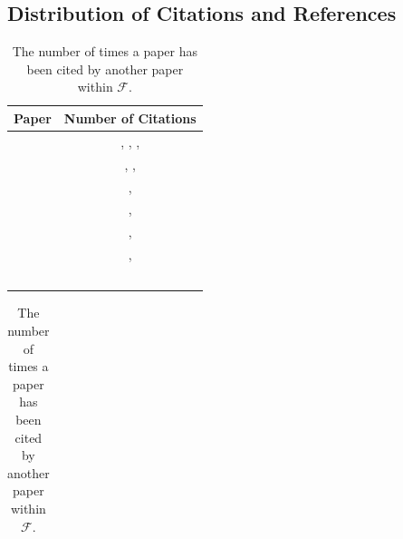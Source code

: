 \subsection{Distribution of Citations and References}

\begin{table}[t]
    \centering
    \begin{minipage}[t]{0.43\textwidth}
        \centering
        \begin{tabular}{l c}
            \toprule
            \textbf{Paper} & \textbf{Number of Citations} \\
            \midrule
            \cite{li_learning_2002} & \cite{auer_sciqa_2023}, \cite{bolotova_non-factoid_2022}, \cite{allam_question_2016}, \cite{chernov_linguistically_2015} \\
            \cite{dubey_lc-quad_2019} & \cite{auer_sciqa_2023}, \cite{usbeck_qald-10_2023}, \cite{banerjee_dblp-quad_2023} \\
            \cite{singhal_att_1999} & \cite{auer_sciqa_2023}, \cite{chernov_linguistically_2015} \\
            \cite{mikhailian_learning_2009} & \cite{auer_sciqa_2023}, \cite{chernov_linguistically_2015} \\
            \cite{auer_sciqa_2023} & \cite{karras_divide_2023}, \cite{taffa_hybrid-squad_2024} \\
            \cite{jaradeh_question_2020} & \cite{karras_divide_2023}, \cite{taffa_hybrid-squad_2024} \\
            \cite{bordes_large-scale_2015} & \cite{auer_sciqa_2023} \\
            \cite{riloff_rule-based_2000} & \cite{auer_sciqa_2023} \\
            \cite{sjoberg_future_2007} & \cite{karras_divide_2023} \\
            \cite{moldovan_structure_2000} & \cite{chernov_linguistically_2015} \\
            \cite{banerjee_dblp-quad_2023} & \cite{taffa_hybrid-squad_2024} \\
            \bottomrule
        \end{tabular}
        \caption[Number of Citations within Paper Selection]{The number of times a paper has been cited by another paper within $\mathcal{F}$.}
        \label{table:papers_by_citations}
    \end{minipage}
    \hfill
    \begin{minipage}[t]{0.55\textwidth}
        \centering
        \begin{tabular}{l c}

\end{tabular}
\end{minipage}
\end{table}
